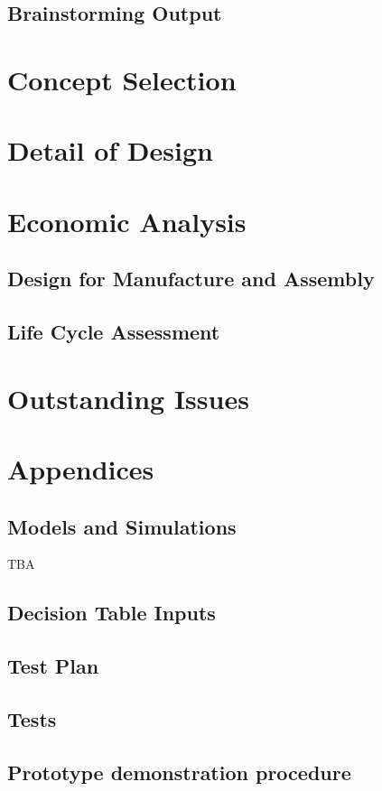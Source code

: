 \documentclass{article}
\begin{document}
\subsection{Brainstorming Output}


\section{Concept Selection}


\section{Detail of Design}






\section{Economic Analysis}
\subsection{Design for Manufacture and Assembly}

\subsection{Life Cycle Assessment}


\section{Outstanding Issues}


\appendix
\section{Appendices}
\subsection{Models and Simulations}
TBA
\subsection{Decision Table Inputs}
\subsection{Test Plan}

\subsection{Tests}

\subsection{Prototype demonstration procedure}

\end{document}
